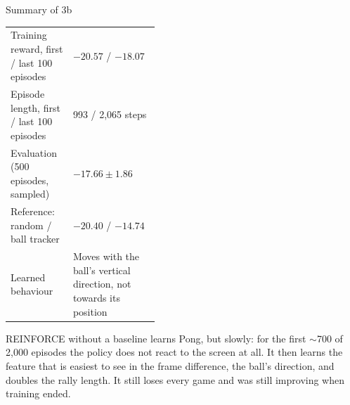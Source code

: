 \FloatBarrier
\begin{summarybox}{Summary of 3b}
\begin{tabularx}{\linewidth}{@{}p{0.42\linewidth}L@{}}
  \toprule
  Training reward, first / last 100 episodes & $-20.57$ / $-18.07$ \\
  Episode length, first / last 100 episodes & 993 / 2,065 steps \\
  Evaluation (500 episodes, sampled) & $\mathbf{-17.66 \pm 1.86}$ \\
  Reference: random / ball tracker & $-20.40$ / $-14.74$ \\
  Learned behaviour & Moves with the ball's vertical direction, not towards its position \\
  \bottomrule
\end{tabularx}

\medskip
REINFORCE without a baseline learns Pong, but slowly: for the first $\sim$700 of 2,000 episodes the policy does not react to the screen at all. It then learns the feature that is easiest to see in the frame difference, the ball's direction, and doubles the rally length. It still loses every game and was still improving when training ended.
\end{summarybox}
